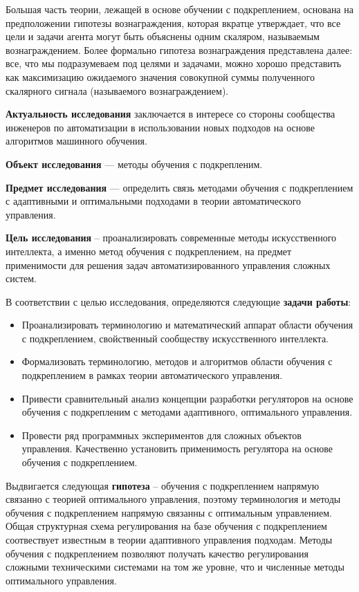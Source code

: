 Большая часть теории, лежащей в основе обучении с подкреплением, основана на предположении гипотезы вознаграждения, которая вкратце утверждает, что все цели и задачи агента могут быть объяснены одним скаляром, называемым вознаграждением. Более формально гипотеза вознаграждения представлена далее:
все, что мы подразумеваем под целями и задачами, можно хорошо представить как максимизацию ожидаемого значения совокупной суммы полученного скалярного сигнала (называемого вознаграждением).


\textbf{Актуальность исследования} заключается в интересе со стороны сообщества инженеров по автоматизации в использовании новых подходов на основе алгоритмов машинного обучения.


\textbf{Объект исследования} --- методы обучения с подкрепленим.

\textbf{Предмет исследования} --- определить связь методами обучения с подкреплением с адаптивными и оптимальными подходами в теории автоматического управления.

\textbf{Цель исследования} -- проанализировать современные методы искусственного интеллекта, а именно метод обучения с подкреплением, на предмет применимости для решения задач автоматизированного управления сложных систем.
  
В соответствии с целью исследования, определяются следующие \textbf{задачи работы}:

\begin{itemize}
	\item Проанализировать терминологию и математический аппарат области обучения с подкреплением, свойственный сообществу искусственного интеллекта.
	\item Формализовать терминологию, методов и алгоритмов области обучения с подкреплением в рамках теории автоматического управления.
	\item Привести сравнительный анализ концепции разработки регуляторов на основе обучения с подкрепленим с методами адаптивного, оптимального управления.
	\item Провести ряд программных экспериментов для сложных объектов управления. Качественно установить применимость регулятора на основе обучения с подкреплением.
\end{itemize} 

Выдвигается следующая \textbf{гипотеза} -- обучения с подкреплением напрямую связанно с теорией оптимального управления, поэтому терминология и методы обучения с подкреплением напрямую связанны с оптимальным управлением. Общая структурная схема регулирования на базе обучения с подкреплением соотвествует известным в теории адаптивного управления подходам. Методы обучения с подкреплением позволяют получать качество регулирования сложными техническими системами на том же уровне, что и численные методы оптимального управления. 


